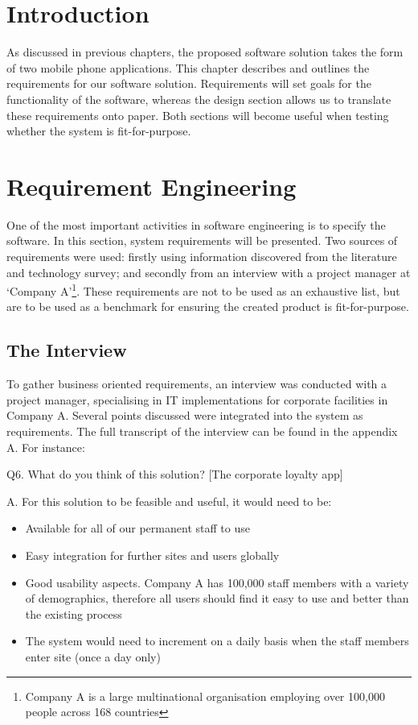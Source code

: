 \section{Introduction}
As discussed in previous chapters, the proposed software solution takes the form of two mobile phone applications. This chapter describes and outlines the requirements for our software solution. Requirements will set goals for the functionality of the software, whereas the design section allows us to translate these requirements onto paper. Both sections will become useful when testing whether the system is fit-for-purpose.

\section{Requirement Engineering}
One of the most important activities in software engineering is to specify the software. In this section, system requirements will be presented. Two sources of requirements were used: firstly using information discovered from the literature and technology survey; and secondly from an interview with a project manager at `Company A'\footnote{Company A is a large multinational organisation employing over 100,000 people across 168 countries}. These requirements are not to be used as an exhaustive list, but are to be used as a benchmark for ensuring the created product is fit-for-purpose.

\subsection{The Interview}
To gather business oriented requirements, an interview was conducted with a project manager, specialising in IT implementations for corporate facilities in Company A. Several points discussed were integrated into the system as requirements. The full transcript of the interview can be found in the appendix A. For instance:


{\selectfont
Q6. What do you think of this solution? [The corporate loyalty app]

A. For this solution to be feasible and useful, it would need to be:

\begin{itemize}
\item Available for all of our permanent staff to use
\item Easy integration for further sites and users globally
\item Good usability aspects. Company A has 100,000 staff members with a variety of demographics, therefore all users should find it easy to use and better than the existing process
\item The system would need to increment on a daily basis when the staff members enter site (once a day only)
\end{itemize}
}

